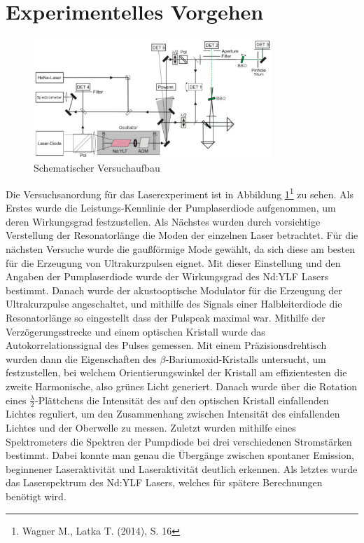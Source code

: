 \section{Experimentelles Vorgehen}
\begin{figure}[]
  \centering
  \includegraphics[width = 0.8\textwidth]{Bilder/Versuchsaufbau.png}
  \caption{Schematischer Versuchaufbau}
  \label{fig:versuchsaufbau}
\end{figure}
Die Versuchsanordung für das Laserexperiment ist in Abbildung \ref{fig:versuchsaufbau}\footnote{Wagner M., Latka T. (2014), S. 16}
zu sehen. Als Erstes wurde die Leistungs-Kennlinie der Pumplaserdiode aufgenommen, um deren Wirkungsgrad festzustellen.
Als Nächstes wurden durch vorsichtige Verstellung der Resonatorlänge die Moden der einzelnen Laser betrachtet.
Für die nächsten Versuche wurde die gaußförmige Mode gewählt, da sich diese am besten für
die Erzeugung von Ultrakurzpulsen eignet.
Mit dieser Einstellung und den Angaben der Pumplaserdiode wurde der
Wirkungsgrad des Nd:YLF Lasers bestimmt. 
Danach wurde der akustooptische Modulator für die Erzeugung der Ultrakurzpulse angeschaltet, und mithilfe des Signals einer Halbleiterdiode die Resonatorlänge so eingestellt dass der Pulspeak maximal war.
Mithilfe der Verzögerungsstrecke und einem optischen Kristall wurde das Autokorrelationssignal des Pulses gemessen.
Mit einem Präzisionsdrehtisch wurden dann die Eigenschaften des $\beta$-Bariumoxid-Kristalls untersucht, um festzustellen, bei welchem Orientierungswinkel der Kristall am effizientesten die zweite Harmonische, also grünes Licht generiert.
Danach wurde über die Rotation eines $\frac{\lambda}{2}$-Plättchens die Intensität des auf den optischen Kristall einfallenden Lichtes reguliert, um den Zusammenhang zwischen Intensität des einfallenden Lichtes und der Oberwelle zu messen.
Zuletzt wurden mithilfe eines Spektrometers die Spektren der Pumpdiode bei drei verschiedenen Stromstärken bestimmt. Dabei konnte man genau die Übergänge zwischen spontaner Emission, beginnener Laseraktivität und Laseraktivität deutlich erkennen. Als letztes wurde das Laserspektrum des Nd:YLF Lasers, welches für spätere Berechnungen benötigt wird.

